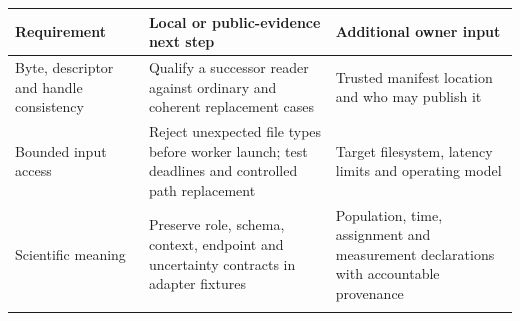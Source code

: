 \begin{longtable}[]{@{}lll@{}}
\toprule
\begin{minipage}[b]{0.30\columnwidth}\raggedright
Requirement\strut
\end{minipage} & \begin{minipage}[b]{0.30\columnwidth}\raggedright
Local or public-evidence next step\strut
\end{minipage} & \begin{minipage}[b]{0.30\columnwidth}\raggedright
Additional owner input\strut
\end{minipage}\tabularnewline
\midrule
\endhead
\begin{minipage}[t]{0.30\columnwidth}\raggedright
Byte, descriptor and handle consistency\strut
\end{minipage} & \begin{minipage}[t]{0.30\columnwidth}\raggedright
Qualify a successor reader against ordinary and coherent replacement
cases\strut
\end{minipage} & \begin{minipage}[t]{0.30\columnwidth}\raggedright
Trusted manifest location and who may publish it\strut
\end{minipage}\tabularnewline
\begin{minipage}[t]{0.30\columnwidth}\raggedright
Bounded input access\strut
\end{minipage} & \begin{minipage}[t]{0.30\columnwidth}\raggedright
Reject unexpected file types before worker launch; test deadlines and
controlled path replacement\strut
\end{minipage} & \begin{minipage}[t]{0.30\columnwidth}\raggedright
Target filesystem, latency limits and operating model\strut
\end{minipage}\tabularnewline
\begin{minipage}[t]{0.30\columnwidth}\raggedright
Scientific meaning\strut
\end{minipage} & \begin{minipage}[t]{0.30\columnwidth}\raggedright
Preserve role, schema, context, endpoint and uncertainty contracts in
adapter fixtures\strut
\end{minipage} & \begin{minipage}[t]{0.30\columnwidth}\raggedright
Population, time, assignment and measurement declarations with
accountable provenance\strut
\end{minipage}\tabularnewline
\begin{minipage}[t]{0.30\columnwidth}\raggedright

\end{minipage}
\end{longtable}
